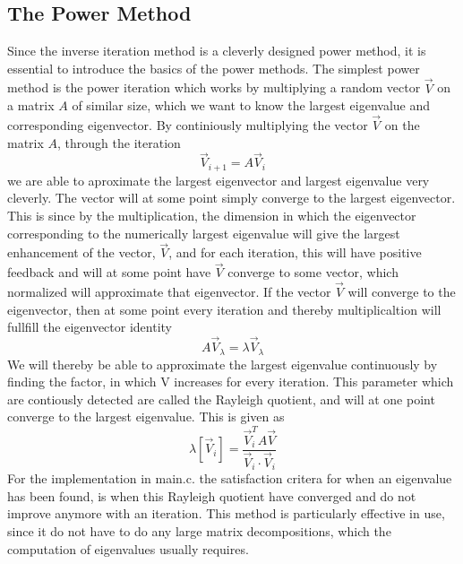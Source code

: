 \documentclass[twocolumn]{article}
\begin{document}
\subsection{\label{sec:1}The Power Method}
Since the inverse iteration method is a cleverly designed power method, it is essential to introduce the basics of the power methods. The simplest power method is the power iteration which works by multiplying a random vector $\vec{V}$ on a matrix $A$ of similar size, which we want to know the largest eigenvalue and corresponding eigenvector. By continiously multiplying the vector $\vec{V}$ on the matrix $A$, through the iteration
\begin{equation}
\vec{V}_{i+1} = A \vec{V}_i \label{eq:1}
\end{equation}
we are able to aproximate the largest eigenvector and largest eigenvalue very cleverly. The vector will at some point simply converge to the largest eigenvector. This is since by the multiplication, the dimension in which the eigenvector corresponding to the numerically largest eigenvalue will give the largest enhancement of the vector, $\vec{V}$, and for each iteration, this will have positive feedback and will at some point have $\vec{V}$ converge to some vector, which normalized will approximate that eigenvector. If the vector $\vec{V}$ will converge to the eigenvector, then at some point every iteration and thereby multiplicaltion will fullfill the eigenvector identity
\begin{equation}
A \vec{V}_\lambda = \lambda \vec{V}_\lambda \label{eq:2}
\end{equation}
We will thereby be able to approximate the largest eigenvalue continuously by finding the factor, in which V increases for every iteration. This parameter which are contiously detected are called the Rayleigh quotient, and will at one point converge to the largest eigenvalue. This is given as
\begin{equation}
\lambda \left[ \vec{V}_i \right] = \frac{\vec{V}^T_i A \vec{V}}{\vec{V}_i \cdot \vec{V}_i} \label{eq:3}
\end{equation}
For the implementation in main.c. the satisfaction critera for when an eigenvalue has been found, is when this Rayleigh quotient have converged and do not improve anymore with an iteration. This method is particularly effective in use, since it do not have to do any large matrix decompositions, which the computation of eigenvalues usually requires. 
\end{document}
